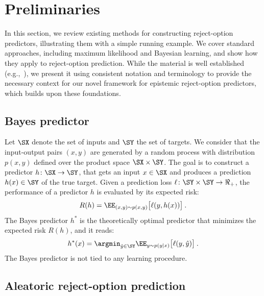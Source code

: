 \section{Preliminaries }

In this section, we review existing methods for constructing reject-option predictors, illustrating them with a simple running example. We cover standard approaches, including maximum likelihood and Bayesian learning, and show how they apply to reject-option prediction. While the material is well established (e.g.,~\cite{Bishop-PRML-2006}), we present it using consistent notation and terminology to provide the necessary context for our novel framework for epistemic reject-option predictors, which builds upon these foundations.

\subsection{Bayes predictor}

Let $\SX$ denote the set of inputs and $\SY$ the set of targets. We consider that the input-output pairs $(x, y)$ are generated by a random process with distribution $p(x, y)$ defined over the product space $\SX \times \SY$. The goal is to construct a predictor $h\colon\SX\rightarrow\SY$, that gets an input  $x\in\SX$ and produces a prediction $h(x)\in\SY$ of the true target. Given a prediction loss $\ell \colon\SY\times\SY\rightarrow\Re_+$, the performance of a predictor $h$ is evaluated by its expected risk:
\[
    R(h) = \EE_{(x,y)\sim p(x,y)}\big [ \ell(y,h(x)) \big ]
\:.
\]
%
The Bayes predictor $h^*$ is the theoretically optimal predictor that minimizes the expected risk $R(h)$, and it reads:
\begin{equation}
\label{equ:BayesPredictor}
   h^*(x) = \argmin_{\hat{y}\in\SY} \EE_{y\sim p(y|x)}\big [ \ell(y,\hat{y})\big ] \:.
\end{equation}
% 
The Bayes predictor is not tied to any learning procedure.

\subsection{Aleatoric reject-option prediction}


